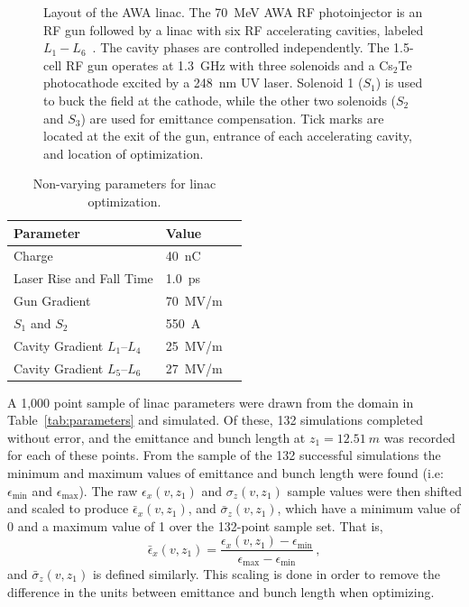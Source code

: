 \begin{figure}
\begin{center}
	\end{center}
	\caption{Layout of the AWA linac. The \SI{70}{MeV} AWA RF photoinjector 
		is an RF gun followed by a linac with six RF accelerating cavities, 
		labeled $L_1-L_6$~\cite{Power:2010zza}.  The cavity phases are controlled independently. 
		The 1.5-cell RF gun operates at \SI{1.3}{GHz} with three solenoids 
		and a Cs$_{2}$Te photocathode excited by a \SI{248}{nm} UV laser.  
		Solenoid 1 ($S_1$) is used to buck the field at the cathode,
		while the other two solenoids ($S_2$ and $S_3$) are used for emittance compensation.  
		Tick marks are located at the exit of the gun, entrance of
		each accelerating cavity, and location of optimization.}
	\label{fig:beamline} 
\end{figure} 
\begin{table}%
	\caption{\label{tab:linac} Non-varying parameters for linac optimization.}
	\begin{center}
		\begin{tabular}{lll}
			\toprule
			\toprule
			\textbf{Parameter} & \textbf{Value} \\
			\midrule
			Charge  & \SI{40}{nC} \\
			Laser Rise and Fall Time & \SI{1.0}{ps} \\
			Gun Gradient & \SI{70}{MV/m} \\
			$S_1$ and $S_2$ & \SI{550}{A}\\
			Cavity Gradient $L_1$--$L_4$ & \SI{25}{MV/m} \\
			Cavity Gradient $L_5$--$L_6$ & \SI{27}{MV/m} \\
			\bottomrule
		\end{tabular}
	\end{center}
\end{table}

A 1,000 point sample of linac parameters were drawn from the domain
in Table~\ref{tab:parameters} and simulated. Of these, 132 simulations completed
without error, and the emittance and bunch length at $z_1=\SI{12.51}{m}$ was
recorded for each of these points. From the sample of the 132 successful simulations 
the minimum and maximum values of emittance and bunch length
were found (i.e: $\epsilon_{\min}$ and $\epsilon_{\max}$). 
The raw $\epsilon_x(v,z_1)$ and $\sigma_z(v,z_1)$ sample values were then
shifted and scaled to produce $\bar{\epsilon}_x(v,z_1)$, and $\bar{\sigma}_z(v,z_1)$,
which have a minimum value of 0 and a maximum value of 1 over the 132-point sample set. That is, 
\begin{equation}
\bar{\epsilon}_x (v,z_1) = \frac{ \epsilon_x (v,z_1) - \epsilon_{\min} } { \epsilon_{\max} - \epsilon_{\min} }\, ,
\label{eq:scale}
\end{equation} 
and $\bar{\sigma}_z (v,z_1)$ is defined similarly.
This scaling is done in order to remove the difference in the units between
emittance and bunch length when optimizing.

